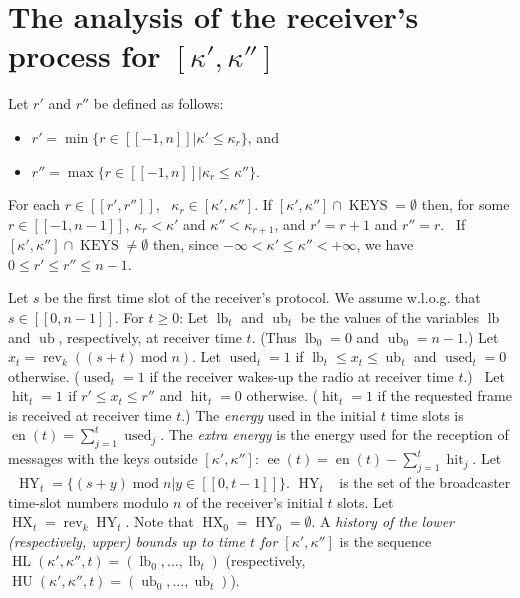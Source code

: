 \documentclass{article}
\newcommand{\tmem}[1]{{\em #1\/}}
\newcommand{\tmop}[1]{\ensuremath{\operatorname{#1}}}
\newcommand{\tmtextbf}[1]{{\bfseries{#1}}}
\newenvironment{itemizedot}{\begin{itemize} \renewcommand{\labelitemi}{$\bullet$}\renewcommand{\labelitemii}{$\bullet$}\renewcommand{\labelitemiii}{$\bullet$}\renewcommand{\labelitemiv}{$\bullet$}}{\end{itemize}}
\begin{document}
\section{\label{Section-analysis}\tmtextbf{The analysis of the receiver's
process for $[\kappa', \kappa'']$}}

Let $r'$ and $r''$ be defined as follows:
\begin{itemizedot}
  \item $r' = \min \{r \in [[- 1, n]] | \kappa' \leq \kappa_r \}$, and
  
  \item $r'' = \max \{r \in [[- 1, n]] | \kappa_r \leq \kappa'' \}$.
\end{itemizedot}
For each $r \in [[r', r'']]$, \ $\kappa_r \in [\kappa', \kappa'']$. If $[\kappa',
\kappa''] \cap \tmop{KEYS} = \emptyset$ then, for some $r \in [[- 1, n - 1]]$,
$\kappa_r < \kappa'$ and $\kappa'' < \kappa_{r + 1}$, and $r' = r + 1$ and
$r'' = r$. \ If $[\kappa', \kappa''] \cap \tmop{KEYS} \not=  \emptyset$ then,
since $- \infty < \kappa' \leq \kappa'' < + \infty$, we have \ $0 \leq r' \leq
r'' \leq n - 1$.

Let $s$ be the first time slot of the receiver's protocol. We assume w.l.o.g.
that $s \in [[0, n - 1]]$. For $t \geq 0$: Let $\tmop{lb}_t$ and $\tmop{ub}_t$
be the values of the variables $\tmop{lb}$ and $\tmop{ub}$, respectively, at
receiver time $t$. (Thus $\tmop{lb}_0 = 0$ and $\tmop{ub}_0 = n - 1$.) Let
$x_t = \tmop{rev}_k ((s + t) \tmop{mod} n)$. Let $\tmop{used}_t = 1$ if
$\tmop{lb}_t \leq x_t \leq \tmop{ub}_t$ and $\tmop{used}_t = 0$ otherwise.
($\tmop{used}_t = 1$ if the receiver wakes-up the radio at receiver time $t$.)
\ Let $\tmop{hit}_t = 1_{}$ if $r' \leq x_t \leq r''$ and $\tmop{hit}_t = 0$
otherwise. ($\tmop{hit}_t = 1$ if the requested frame is received at receiver
time $t$.) The {\tmem{energy}} used in the initial $t$ time slots is
$\tmop{en} (t) = \sum_{j = 1}^t \tmop{used}_j$. The {\tmem{extra energy}} is
the energy used for the reception of messages with the keys outside $[\kappa',
\kappa'']$: $\tmop{ee} (t) = \tmop{en} (t) - \sum_{j = 1}^t \tmop{hit}_j$. Let
\ $\tmop{HY}_t =\{(s + y) \tmop{mod} n | y \in [[0, t - 1]]\}$. $\tmop{HY}_t$
\ is the set of the broadcaster time-slot numbers modulo $n$ of the receiver's
initial $t$ slots. Let $\tmop{HX}_t = \tmop{rev}_k \tmop{HY}_t$. Note that
$\tmop{HX}_0 = \tmop{HY}_0 = \emptyset$. A {\tmem{history of the lower
(respectively, upper) bounds up to time $t$ for $[\kappa', \kappa'']$}} is the
sequence \ $\tmop{HL} (\kappa', \kappa'', t) = (\tmop{lb}_0, \ldots,
\tmop{lb}_t)$ (respectively, $\tmop{HU} (\kappa', \kappa'', t) = (\tmop{ub}_0,
\ldots, \tmop{ub}_t)$).
\end{document}

